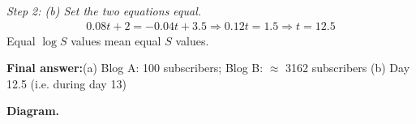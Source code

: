 \documentclass[11pt]{article}
\begin{document}
\textit{Step 2: (b) Set the two equations equal.}
\[\begin{gathered}
0.08t + 2 = -0.04t + 3.5 \Rightarrow 0.12t = 1.5 \Rightarrow t = 12.5
\end{gathered}\]
Equal \( \log S \) values mean equal \( S \) values.

\begin{answerbox}
\textbf{Final answer:}\quad (a) Blog A: 100 subscribers; Blog B: $\approx$ 3162 subscribers \quad  (b) Day 12.5 (i.e. during day 13)
\end{answerbox}
\textbf{Diagram.}

\begin{center}
\end{center}
\end{document}
